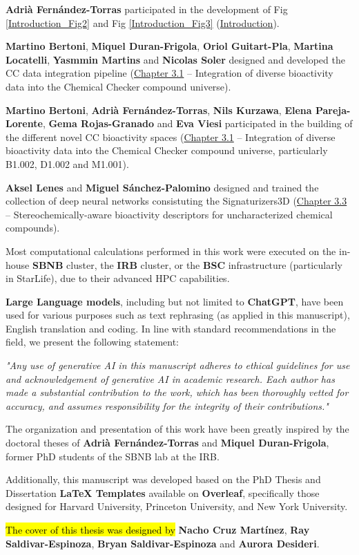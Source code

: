 

\textbf{Adrià Fernández-Torras} participated in the development of Fig \ref{Introduction_Fig2} and Fig \ref{Introduction_Fig3} (\hyperref[introduction]{Introduction}).

\textbf{Martino Bertoni}, \textbf{Miquel Duran-Frigola}, \textbf{Oriol Guitart-Pla}, \textbf{Martina Locatelli}, \textbf{Yasmmin Martins} and \textbf{Nicolas Soler} designed and developed the CC data integration pipeline (\hyperref[Chapter_3.1]{Chapter 3.1} -- Integration of diverse bioactivity data into the Chemical Checker compound universe).

\textbf{Martino Bertoni}, \textbf{Adrià Fernández-Torras}, \textbf{Nils Kurzawa}, \textbf{Elena Pareja-Lorente}, \textbf{Gema Rojas-Granado} and \textbf{Eva Viesi} participated in the building of the different novel CC bioactivity spaces (\hyperref[Chapter_3.1]{Chapter 3.1} -- Integration of diverse bioactivity data into the Chemical Checker compound universe, particularly B1.002, D1.002 and M1.001).

\textbf{Aksel Lenes} and \textbf{Miguel Sánchez-Palomino} designed and trained the collection of deep neural networks consistuting the Signaturizers3D (\hyperref[Chapter_3.3]{Chapter 3.3} -- Stereochemically-aware bioactivity descriptors for uncharacterized chemical compounds).

Most computational calculations performed in this work were executed on the in-house \textbf{SBNB} cluster, the \textbf{IRB} cluster, or the \textbf{BSC} infrastructure (particularly in StarLife), due to their advanced HPC capabilities.

\textbf{Large Language models}, including but not limited to \textbf{ChatGPT}, have been used for various purposes such as text rephrasing (as applied in this manuscript), English translation and coding. In line with standard recommendations in the field\cite{porsdam_mann_guidelines_2024}, we present the following statement:

\textit{"Any use of generative AI in this manuscript adheres to ethical guidelines for use and acknowledgement of generative AI in academic research. Each author has made a substantial contribution to the work, which has been thoroughly vetted for accuracy, and assumes responsibility for the integrity of their contributions."}

The organization and presentation of this work have been greatly inspired by the doctoral theses of \textbf{Adrià Fernández-Torras} and \textbf{Miquel Duran-Frigola}, former PhD students of the SBNB lab at the IRB. 

Additionally, this manuscript was developed based on the PhD Thesis and Dissertation \textbf{LaTeX Templates} available on \textbf{Overleaf}, specifically those designed for Harvard University, Princeton University, and New York University.

\hl{The cover of this thesis was designed by} \textbf{Nacho Cruz Martínez}, \textbf{Ray Saldivar-Espinoza}, \textbf{Bryan Saldivar-Espinoza} and \textbf{Aurora Desideri}. 